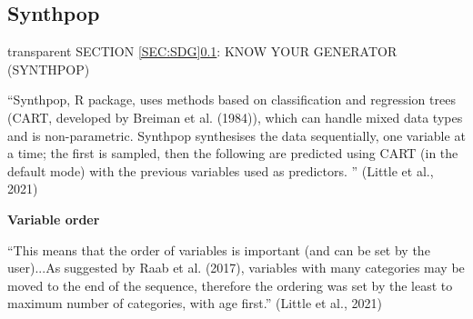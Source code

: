 \documentclass[t,8pt,utfx8]{beamer}
\begin{document}
\begin{spacing}{1.25}

\subsection{Synthpop}\label{sec:sdg_synthpop}
\begin{frame}[c,plain]
\vskip-4mm
\begin{beamercolorbox}[wd=\boxwidth,ht=22.11mm]{transparent}%
    \vfill%
    \leftinsert%
    \MakeUppercase{Section \ref{sec:sdg}\ref{sec:sdg_synthpop}: Know your generator (Synthpop)} %
\end{beamercolorbox}
\vskip-3mm

``Synthpop, R package, uses methods based on classification and regression trees (CART, developed by Breiman et al. (1984)), which can handle mixed data types and is non-parametric. Synthpop synthesises the data sequentially, one variable at a time; the first is sampled, then the following are predicted using CART (in the default mode) with the previous variables used as predictors. ''  (Little et al., 2021)

{\bf Variable order}

``This means that the order of variables is important (and can be set by the user)...As suggested by Raab et al. (2017), variables with many categories may be moved to the end of the sequence, therefore the ordering was set by the least to maximum number of categories, with age first.''  (Little et al., 2021)


\end{frame}
\end{spacing}
\end{document}
